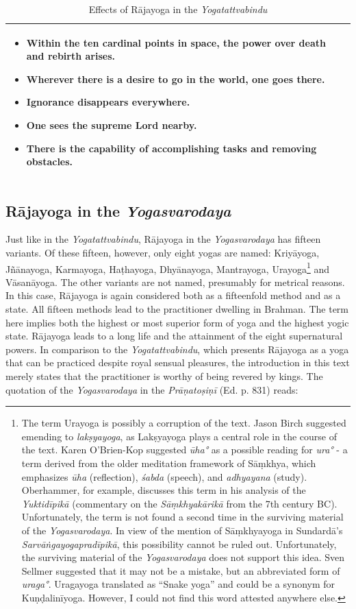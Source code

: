 \begin{table}[H]
\begin{tabular}{|p{3cm}|p{4cm}|p{4cm}|}
\begin{itemize}
    \item Within the ten cardinal points in space, the power over death and rebirth arises.
    \item Wherever there is a desire to go in the world, one goes there.
    \item Ignorance disappears everywhere.
    \item One sees the supreme Lord nearby.
    \item There is the capability of accomplishing tasks and removing obstacles.
\end{itemize} \\
\hline
\end{tabular}
\caption{Effects of Rājayoga in the \emph{Yogatattvabindu}}
\end{table}
\normalsize
\newpage 
\subsection{Rājayoga in the \textit{Yogasvarodaya}}

Just like in the \emph{Yogatattvabindu}, Rājayoga in the \emph{Yogasvarodaya} has fifteen variants. Of these fifteen, however, only eight yogas are named: Kriyāyoga, Jñānayoga, Karmayoga, Haṭhayoga, Dhyānayoga, Mantrayoga, Urayoga\footnote{The term Urayoga is possibly a corruption of the text. Jason Birch suggested emending to \textit{lakṣyayoga}, as Lakṣyayoga plays a central role in the course of the text. Karen O'Brien-Kop suggested \textit{ūha°} as a possible reading for \textit{ura°} - a term derived from the older meditation framework of Sāṃkhya, which emphasizes \textit{ūha} (reflection), \textit{śabda} (speech), and \textit{adhyayana} (study). Oberhammer, for example, discusses this term in his analysis of the \emph{Yuktidīpikā} (commentary on the \emph{Sāṃkhyakārikā} from the 7th century BC). Unfortunately, the term is not found a second time in the surviving material of the \emph{Yogasvarodaya}. In view of the mention of Sāṃkhyayoga in Sundardā's \textit{Sarvāṅgayogapradīpikā}, this possibility cannot be ruled out. Unfortunately, the surviving material of the \textit{Yogasvarodaya} does not support this idea. Sven Sellmer suggested that it may not be a mistake, but an abbreviated form of \textit{uraga°}. Uragayoga translated as ``Snake yoga'' and could be a synonym for Kuṇḍalinīyoga. However, I could not find this word attested anywhere else.} and Vāsanāyoga. The other variants are not named, presumably for metrical reasons. In this case, Rājayoga is again considered both as a fifteenfold method and as a state. All fifteen methods lead to the practitioner dwelling in Brahman. The term here implies both the highest or most superior form of yoga and the highest yogic state. Rājayoga leads to a long life and the attainment of the eight supernatural powers. In comparison to the \emph{Yogatattvabindu}, which presents Rājayoga as a yoga that can be practiced despite royal sensual pleasures, the introduction in this text merely states that the practitioner is worthy of being revered by kings. The quotation of the \textit{Yogasvarodaya} in the \emph{Prāṇatoṣiṇī} (Ed. p. 831) reads:  

